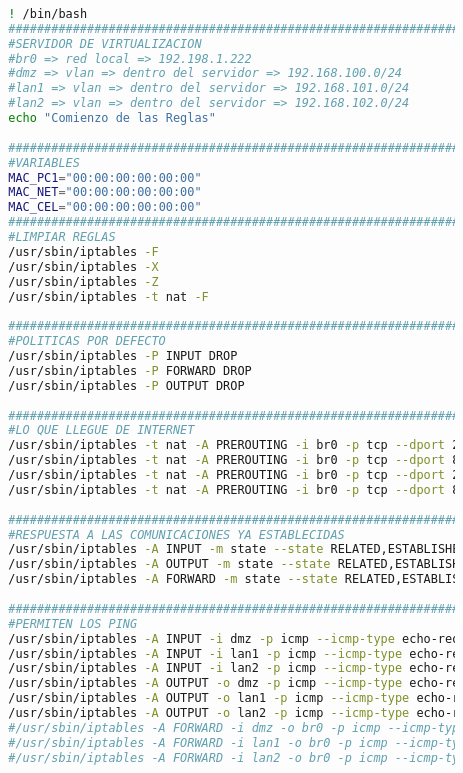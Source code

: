 		\begin{lstlisting}[language=Bash, caption=iptables]
			
		! /bin/bash
		######################################################################################################
		#SERVIDOR DE VIRTUALIZACION
		#br0 => red local => 192.198.1.222
		#dmz => vlan => dentro del servidor => 192.168.100.0/24
		#lan1 => vlan => dentro del servidor => 192.168.101.0/24
		#lan2 => vlan => dentro del servidor => 192.168.102.0/24
		echo "Comienzo de las Reglas"
		
	    ########################################################################################
		#VARIABLES
		MAC_PC1="00:00:00:00:00:00"	
		MAC_NET="00:00:00:00:00:00"	
		MAC_CEL="00:00:00:00:00:00"	
		########################################################################################
		#LIMPIAR REGLAS
		/usr/sbin/iptables -F
		/usr/sbin/iptables -X
		/usr/sbin/iptables -Z
		/usr/sbin/iptables -t nat -F
		
		########################################################################################
		#POLITICAS POR DEFECTO
		/usr/sbin/iptables -P INPUT DROP
		/usr/sbin/iptables -P FORWARD DROP
		/usr/sbin/iptables -P OUTPUT DROP
		
		########################################################################################
		#LO QUE LLEGUE DE INTERNET
		/usr/sbin/iptables -t nat -A PREROUTING -i br0 -p tcp --dport 2220 -j DNAT --to 192.168.100.2:2222
		/usr/sbin/iptables -t nat -A PREROUTING -i br0 -p tcp --dport 8096 -j DNAT --to 192.168.100.2:8096
		/usr/sbin/iptables -t nat -A PREROUTING -i br0 -p tcp --dport 2221 -j DNAT --to 192.168.100.3:2222
		/usr/sbin/iptables -t nat -A PREROUTING -i br0 -p tcp --dport 8080 -j DNAT --to 192.168.100.3:80
		
		########################################################################################
		#RESPUESTA A LAS COMUNICACIONES YA ESTABLECIDAS
		/usr/sbin/iptables -A INPUT -m state --state RELATED,ESTABLISHED -j ACCEPT
		/usr/sbin/iptables -A OUTPUT -m state --state RELATED,ESTABLISHED -j ACCEPT
		/usr/sbin/iptables -A FORWARD -m state --state RELATED,ESTABLISHED -j ACCEPT
		
		########################################################################################
		#PERMITEN LOS PING
		/usr/sbin/iptables -A INPUT -i dmz -p icmp --icmp-type echo-request -j ACCEPT #PING
		/usr/sbin/iptables -A INPUT -i lan1 -p icmp --icmp-type echo-request -j ACCEPT #PING
		/usr/sbin/iptables -A INPUT -i lan2 -p icmp --icmp-type echo-request -j ACCEPT #PING
		/usr/sbin/iptables -A OUTPUT -o dmz -p icmp --icmp-type echo-request -j ACCEPT #PING
		/usr/sbin/iptables -A OUTPUT -o lan1 -p icmp --icmp-type echo-request -j ACCEPT #PING
		/usr/sbin/iptables -A OUTPUT -o lan2 -p icmp --icmp-type echo-request -j ACCEPT #PING
		#/usr/sbin/iptables -A FORWARD -i dmz -o br0 -p icmp --icmp-type echo-request -j ACCEPT
		#/usr/sbin/iptables -A FORWARD -i lan1 -o br0 -p icmp --icmp-type echo-request -j ACCEPT
		#/usr/sbin/iptables -A FORWARD -i lan2 -o br0 -p icmp --icmp-type echo-request -j ACCEPT
		

\end{lstlisting}
